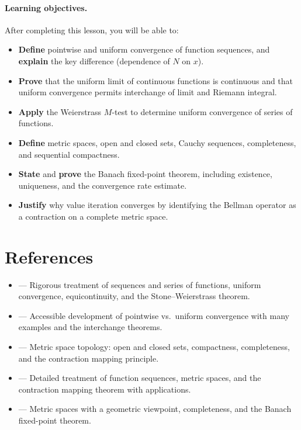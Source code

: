 \documentclass[11pt,a4paper]{article}
\begin{document}
\paragraph{Learning objectives.}
After completing this lesson, you will be able to:
\begin{itemize}[nosep]
  \item \textbf{Define} pointwise and uniform convergence of function
    sequences, and \textbf{explain} the key difference (dependence of
    $N$ on $x$).
  \item \textbf{Prove} that the uniform limit of continuous functions is
    continuous and that uniform convergence permits interchange of limit
    and Riemann integral.
  \item \textbf{Apply} the Weierstrass $M$-test to determine uniform
    convergence of series of functions.
  \item \textbf{Define} metric spaces, open and closed sets, Cauchy
    sequences, completeness, and sequential compactness.
  \item \textbf{State} and \textbf{prove} the Banach fixed-point
    theorem, including existence, uniqueness, and the convergence rate
    estimate.
  \item \textbf{Justify} why value iteration converges by identifying
    the Bellman operator as a contraction on a complete metric space.
\end{itemize}

\section{References}
\label{sec:references}

\begin{itemize}
  \item \citet[Chapter 7]{rudin1976} --- Rigorous treatment of sequences
    and series of functions, uniform convergence, equicontinuity, and
    the Stone--Weierstrass theorem.
  \item \citet[Chapter 6]{abbott2015} --- Accessible development of
    pointwise vs.\ uniform convergence with many examples and the
    interchange theorems.
  \item \citet[Chapter 2]{rudin1976} --- Metric space topology: open
    and closed sets, compactness, completeness, and the contraction
    mapping principle.
  \item \citet[Chapters 8--9]{bartle2011} --- Detailed treatment of
    function sequences, metric spaces, and the contraction mapping
    theorem with applications.
  \item \citet[Chapter 2]{pugh2015} --- Metric spaces with a geometric
    viewpoint, completeness, and the Banach fixed-point theorem.
\end{itemize}
\end{document}

